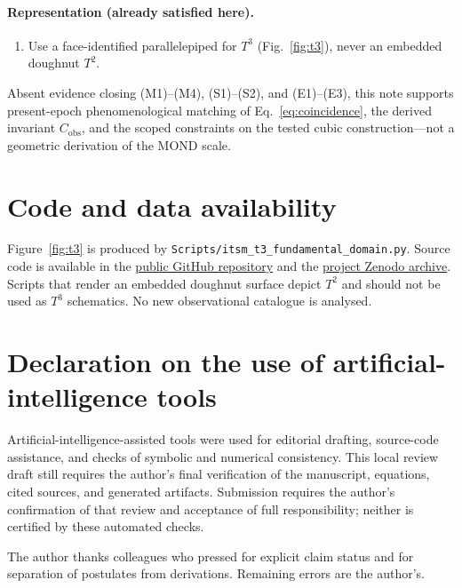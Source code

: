 \documentclass[aps,prd,reprint,superscriptaddress,nofootinbib,floatfix,showkeys]{revtex4-2}
\newcommand{\Tthree}{T^{3}}
\newcommand{\Ttwo}{T^{2}}
\newcommand{\Cobs}{C_{\mathrm{obs}}}
\begin{document}
\paragraph{Representation (already satisfied here).}
\begin{enumerate}
\item[(R1)] Use a face-identified parallelepiped for \(\Tthree\)
  (Fig.~\ref{fig:t3}), never an embedded doughnut \(\Ttwo\).
\end{enumerate}

Absent evidence closing (M1)--(M4), (S1)--(S2), and (E1)--(E3), this note
supports present-epoch phenomenological matching of
Eq.~\eqref{eq:coincidence}, the derived invariant \(\Cobs\), and the scoped
constraints on the tested cubic construction---not a geometric derivation of
the MOND scale.

\section*{Code and data availability}

\begingroup
\raggedright
Figure~\ref{fig:t3} is produced by
\texttt{Scripts/itsm\_t3\_fundamental\_domain.py}.
Source code is available in the
\href{https://github.com/brendohxd/ITSM-Integrated-Toroidal-Syntropic-Model}{public GitHub repository}
and the \href{https://doi.org/10.5281/zenodo.18808348}{project Zenodo archive}.
Scripts that render an embedded doughnut surface depict \(\Ttwo\) and should
not be used as \(\Tthree\) schematics.  No new observational catalogue is
analysed.
\par
\endgroup

\section*{Declaration on the use of artificial-intelligence tools}

Artificial-intelligence-assisted tools were used for editorial drafting,
source-code assistance, and checks of symbolic and numerical consistency.
This local review draft still requires the author's final verification of
the manuscript, equations, cited sources, and generated artifacts. Submission
requires the author's confirmation of that review and acceptance of full
responsibility; neither is certified by these automated checks.

\begin{acknowledgments}
The author thanks colleagues who pressed for explicit claim status and for
separation of postulates from derivations.  Remaining errors are the author's.
\end{acknowledgments}


\end{document}
